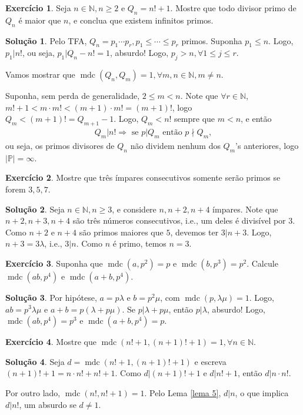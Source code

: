 \documentclass[a4paper,11pt,twoside, leqno]{article}
\DeclareMathOperator{\mdc}{mdc}
\theoremstyle{definition}
\newtheorem{exercise}{Exercício}
\newtheorem*{solution}{Solução}
\begin{document}
\begin{exercise}
	Seja $n\in\mathbb{N}, n\geq 2$ e $Q_n = n!+1$. Mostre que todo divisor primo de $Q_n$ é maior que $n$, e conclua que existem infinitos primos.
\end{exercise}
\begin{solution}
	Pelo TFA, $Q_n = p_1\cdots p_r, p_1\leq \cdots\leq p_r$ primos. Suponha $p_1\leq n$. Logo, $p_1|n!$, ou seja, $p_1| Q_n - n! = 1$, absurdo! Logo, $p_j > n, \forall 1\leq j\leq r$. 
	
	Vamos mostrar que $\mdc(Q_n, Q_m) = 1, \forall m,n\in\mathbb{N}, m\neq n$. 
	
	Suponha, sem perda de generalidade, $2\leq m < n$. Note que $\forall r\in\mathbb{N}$, $m!+1 < m\cdot m! < (m+1)\cdot m! = (m+1)!$, logo $Q_m < (m+1)! = Q_{m+1} - 1$. Logo, $Q_m < n!$ sempre que $m<n$, e então
	\begin{align*}
	Q_m|n! \Rightarrow \text{ se } p|Q_m \text{ então } p\nmid Q_m,
	\end{align*} 
	ou seja, os primos divisores de $Q_n$ não dividem nenhum dos $Q_m$'s anteriores, logo $|\mathbb{P}| = \infty$.
\end{solution}
\begin{exercise}
	Mostre que três ímpares consecutivos somente serão primos se forem $3,5,7$.
\end{exercise}
\begin{solution}
	Seja $n\in\mathbb{N}, n\geq 3$, e considere $n, n+2, n+4$ ímpares. Note que $n+2, n+3, n+4$ são três números consecutivos, i.e., um deles é divisível por $3$. Como $n+2$ e $n+4$ são primos maiores que $5$, devemos ter $3|n+3$. Logo, $n+3 = 3\lambda$, i.e., $3|n$. Como $n$ é primo, temos $n=3$.
\end{solution}
\begin{exercise}
	Suponha que $\mdc(a,p^2) = p$ e $\mdc(b,p^3) = p^2$. Calcule $\mdc(ab, p^4)$ e $\mdc(a+b,p^4)$.
\end{exercise}
\begin{solution}
	Por hipótese, $a = p\lambda$ e $b = p^2\mu$, com $\mdc(p, \lambda\mu) = 1$. Logo, $ab = p^3\lambda\mu$ e $a+b = p(\lambda + p\mu)$. Se $p|\lambda + p\mu$, então $p|\lambda$, absurdo! Logo, $\mdc(ab,p^4) = p^3$ e $\mdc(a+b,p^4) = p$.
\end{solution}
\begin{exercise}
	Mostre que $\mdc(n!+1, (n+1)! + 1) = 1, \forall n\in\mathbb{N}$.
\end{exercise}
\begin{solution}
	Seja $d = \mdc(n! + 1, (n+1)! + 1)$ e escreva $(n+1)! + 1 = n\cdot n! + n! + 1$. Como $d|(n+1)! + 1$ e $d|n!+1$, então $d|n\cdot n!$.
	
	Por outro lado, $\mdc(n!, n!+1) = 1$. Pelo Lema \eqref{lema 5}, $d|n$, o que implica $d|n!$, um absurdo se $d\neq 1$.
\end{solution}
\end{document}
